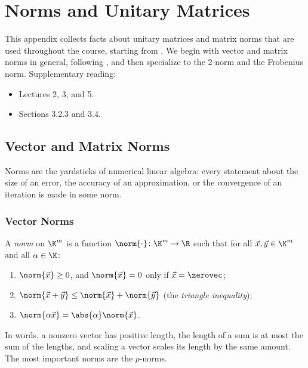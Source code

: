 \chapter{Norms and Unitary Matrices}
\label{app:norms}

This appendix collects facts about unitary matrices and matrix norms that are used throughout the course, starting from . We begin with vector and matrix norms in general, following \cite[Lecture 3]{TB}, and then specialize to the $2$-norm and the Frobenius norm. Supplementary reading:
\begin{itemize}
  \item \cite{TB} Lectures 2, 3, and 5.
  \item \cite{Demmel} Sections 3.2.3 and 3.4.
\end{itemize}

\section{Vector and Matrix Norms}
\label{sec:norms}

Norms are the yardsticks of numerical linear algebra: every statement about the size of an error, the accuracy of an approximation, or the convergence of an iteration is made in some norm.

\subsection{Vector Norms}

\begin{definition}
  \label{def:vector-norm}
  A \emph{norm} on $\K^m$ is a function $\norm{\cdot} \colon \K^m \to \R$ such that for all $\vec{x}, \vec{y} \in \K^m$ and all $\alpha \in \K$:
  \begin{enumerate}
    \item $\norm{\vec{x}} \ge 0$, and $\norm{\vec{x}} = 0$ only if $\vec{x} = \zerovec$;
    \item $\norm{\vec{x} + \vec{y}} \le \norm{\vec{x}} + \norm{\vec{y}}$ (the \emph{triangle inequality});
    \item $\norm{\alpha\vec{x}} = \abs{\alpha}\norm{\vec{x}}$.
  \end{enumerate}
\end{definition}

In words, a nonzero vector has positive length, the length of a sum is at most the sum of the lengths, and scaling a vector scales its length by the same amount. The most important norms are the $p$-norms.

